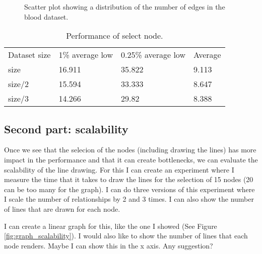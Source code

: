 \begin{figure}[h!]
  \centering
  \begin{minipage}{.7\textwidth}
  \end{minipage}
\caption{Scatter plot showing a distribution of the number of edges in the blood dataset.}
\label{fig:edges_nodes_blood}
\end{figure}

\begin{table}[h!]
\centering
\begin{tabular}{llll}
Dataset size & 1\% average low & 0.25\% average low & Average \\
size & 16.911 & 35.822 & 9.113 \\
size/2 & 15.594 & 33.333 & 8.647 \\
size/3 & 14.266 & 29.82 & 8.388 \\
\end{tabular}
\caption{Performance of select node.}
\label{tab:experiment_select}
\end{table}

\subsection{Second part: scalability}

Once we see that the selecion of the nodes (including drawing the lines) has more impact in the performance and that it can create bottlenecks, we can evaluate the scalability of the line drawing. For this I can create an experiment where I measure the time that it takes to draw the lines for the selection of 15 nodes (20 can be too many for the graph). I can do three versions of this experiment where I scale the number of relationships by 2 and 3 times. I can also show the number of lines that are drawn for each node.

I can create a linear graph for this, like the one I showed (See Figure \ref{fig:graph_scalability}). I would also like to show the number of lines that each node renders. Maybe I can show this in the x axis. Any suggestion?

